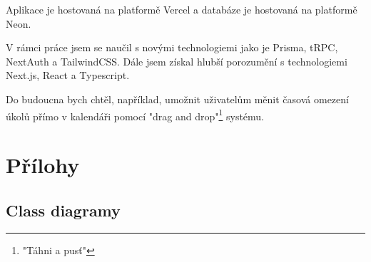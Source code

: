 \documentclass[a4paper,12pt]{report}
\begin{document}
Aplikace je hostovaná na platformě Vercel\cite{vercel} a databáze je hostovaná na platformě Neon\cite{neon}.

V rámci práce jsem se naučil s novými technologiemi jako je Prisma, tRPC, NextAuth a TailwindCSS. Dále jsem získal hlubší porozumění s technologiemi Next.js, React a Typescript.

Do budoucna bych chtěl, například, umožnit uživatelům měnit časová omezení úkolů přímo v kalendáři pomocí "drag and drop"\footnote{"Táhni a pusť"} systému.
\chapter{Přílohy}

\begin{landscape}

\section{Class diagramy}


\end{landscape}
\end{document}
